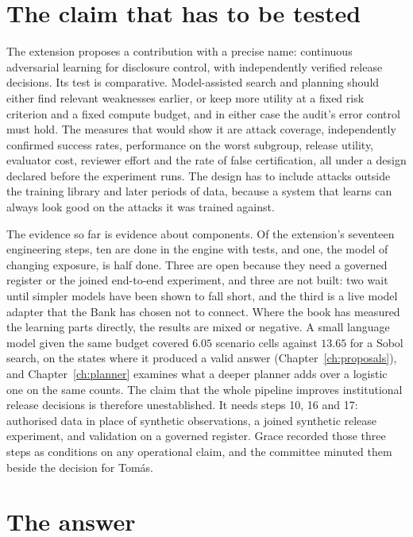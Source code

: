 \section{The claim that has to be tested}

The extension proposes a contribution with a precise name: continuous adversarial learning
for disclosure control, with independently verified release decisions. Its test is comparative. Model-assisted search and planning should either find relevant weaknesses earlier, or
keep more utility at a fixed risk criterion and a fixed compute budget, and in either case
the audit's error control must hold. The measures that would show it are attack coverage,
independently confirmed success rates, performance on the worst subgroup, release utility,
evaluator cost, reviewer effort and the rate of false certification, all under a design declared
before the experiment runs. The design has to include attacks outside the training library
and later periods of data, because a system that learns can always look good on the attacks
it was trained against.

The evidence so far is evidence about components. Of the extension's seventeen engineering steps, ten are done in the engine with tests, and one, the model of changing exposure, is half done. Three are open because they need a governed register or the joined
end-to-end experiment, and three are not built: two wait until simpler models have been
shown to fall short, and the third is a live model adapter that the Bank has chosen not to
connect. Where the book has measured the learning parts directly, the results are mixed or
negative. A small language model given the same budget covered $6.05$ scenario cells against
$13.65$ for a Sobol search, on the states where it produced a valid answer (Chapter~\ref{ch:proposals}), and
Chapter~\ref{ch:planner} examines what a deeper planner adds over a logistic one on the same counts.
The claim that the whole pipeline improves institutional release decisions is therefore unestablished. It needs steps 10, 16 and 17: authorised data in place of synthetic observations,
a joined synthetic release experiment, and validation on a governed register. Grace recorded
those three steps as conditions on any operational claim, and the committee minuted them
beside the decision for Tom\'as.

\section{The answer}

